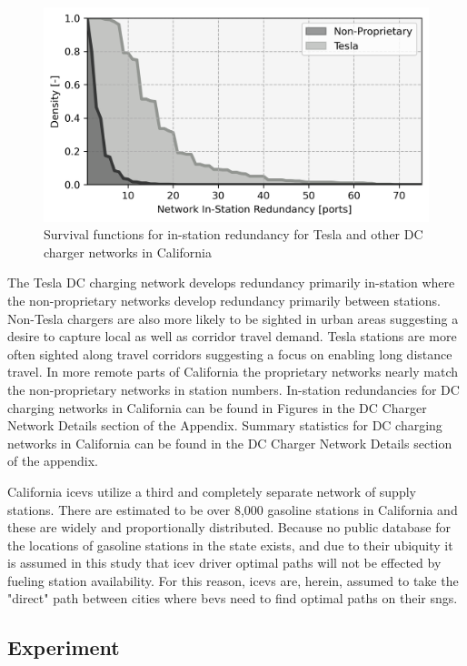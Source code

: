 \begin{multicols}{2}
\begin{figure}[H]
	\centering
	\includegraphics[width = \linewidth]{figs/California_RIS_Hist.png}
	\caption{Survival functions for in-station redundancy for Tesla and other DC charger networks in California}
	\label{fig:network_histograms}
\end{figure}

The Tesla DC charging network develops redundancy primarily in-station where the non-proprietary networks develop redundancy primarily between stations. Non-Tesla chargers are also more likely to be sighted in urban areas suggesting a desire to capture local as well as corridor travel demand. Tesla stations are more often sighted along travel corridors suggesting a focus on enabling long distance travel. In more remote parts of California the proprietary networks nearly match the non-proprietary networks in station numbers. In-station redundancies for DC charging networks in California can be found in Figures in the DC Charger Network Details section of the Appendix. Summary statistics for DC charging networks in California can be found in the DC Charger Network Details section of the appendix.

California \glspl{icev} utilize a third and completely separate network of supply stations. There are estimated to be over 8,000 gasoline stations in California \cite{CEC_2022} and these are widely and proportionally distributed. Because no public database for the locations of gasoline stations in the state exists, and due to their ubiquity it is assumed in this study that \gls{icev} driver optimal paths will not be effected by fueling station availability. For this reason, \glspl{icev} are, herein, assumed to take the "direct" path between cities where \glspl{bev} need to find optimal paths on their \glspl{sng}.

\subsection*{Experiment}


\end{multicols}
